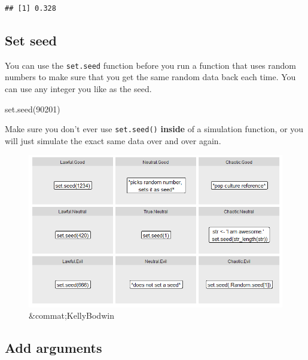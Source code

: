\documentclass[
  oneside]{book}
\newenvironment{Shaded}{\begin{snugshade}}{\end{snugshade}}
\newcommand{\DecValTok}[1]{\textcolor[rgb]{0.00,0.00,0.81}{#1}}
\newcommand{\FunctionTok}[1]{\textcolor[rgb]{0.00,0.00,0.00}{#1}}
\newcommand{\NormalTok}[1]{#1}
\begin{document}
\begin{verbatim}
## [1] 0.328
\end{verbatim}

\hypertarget{seed}{%
\subsection{Set seed}\label{seed}}

You can use the \texttt{set.seed} function before you run a function that uses random numbers to make sure that you get the same random data back each time. You can use any integer you like as the seed.

\begin{Shaded}
\begin{Highlighting}[]
\FunctionTok{set.seed}\NormalTok{(}\DecValTok{90201}\NormalTok{)}
\end{Highlighting}
\end{Shaded}

\begin{warning}
Make sure you don't ever use \texttt{set.seed()} \textbf{inside} of a simulation function, or you will just simulate the exact same data over and over again.

\end{warning}

\begin{figure}

{\centering \includegraphics[width=1\linewidth]{images/memes/seed_alignment} 

}

\caption{&commat;KellyBodwin}\label{fig:img-seed-alignment}
\end{figure}

\hypertarget{add-arguments}{%
\subsection{Add arguments}\label{add-arguments}}
\end{document}
